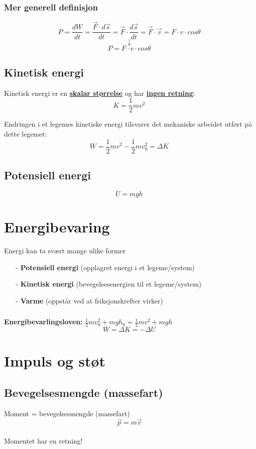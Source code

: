 \documentclass[12pt]{article}
\begin{document}
\subsubsection{Mer generell definisjon}
$$P = \frac{dW}{dt} = \frac{\Vec{F}\cdot d\Vec{s}}{dt} = \Vec{F}\cdot\frac{ d\Vec{s}}{dt} = \Vec{F}\cdot\Vec{v} = F\cdot v\cdot cos \theta$$
$$\downarrow$$
$$P = F\cdot v\cdot cos \theta$$
%
\subsection{Kinetisk energi}
Kinetisk energi er en \underline{\textbf{skalar størrelse}} og har \underline{\textbf{ingen retning}}:
$$K = \frac{1}{2}mv^2$$

Endringen i et legemes kinetiske energi tilsvarer det mekaniske arbeidet utført på dette legemet:
$$W = \frac{1}{2}mv^2 - \frac{1}{2}mv_0^2 = \Delta K$$
\subsection{Potensiell energi}
$$U = mgh$$

\section{Energibevaring}
Energi kan ta svært mange ulike former
\begin{itemize}
    \item[-] \textbf{Potensiell energi} (opplagret energi i et legeme/system)
    \item[-] \textbf{Kinetisk energi} (bevegelsesenergien til et legeme/system)
    \item[-] \textbf{Varme} (oppstår ved at friksjonskrefter virker)
\end{itemize}
\subsubsection{}
\textbf{Energibevarlingsloven: }$\frac{1}{2}mv_0^2+mgh_0 = \frac{1}{2}mv^2+mgh$
$$W = \Delta K = -\Delta U$$

\section{Impuls og støt}
\subsection{Bevegelsesmengde (massefart)}
Moment = bevegelsesmengde (massefart)\\
$$\Vec{p} = m\Vec{v}$$\\
Momentet har en retning!
\end{document}
